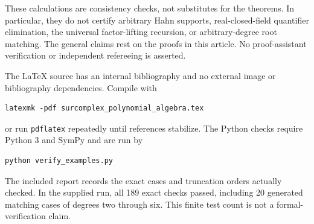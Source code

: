 \documentclass[11pt,letterpaper]{article}
\numberwithin{equation}{section}
\theoremstyle{definition}
\theoremstyle{remark}\newtheorem{remark}[theorem]{Remark}
\begin{document}
These calculations are consistency checks, not substitutes for the
theorems. In particular, they do not certify arbitrary Hahn supports,
real-closed-field quantifier elimination, the universal factor-lifting
recursion, or arbitrary-degree root matching. The general claims rest
on the proofs in this article. No proof-assistant verification or
independent refereeing is asserted.

The LaTeX source has an internal bibliography and no external image or
bibliography dependencies. Compile with
\begin{verbatim}
latexmk -pdf surcomplex_polynomial_algebra.tex
\end{verbatim}
or run \texttt{pdflatex} repeatedly until references stabilize.
The Python checks require Python 3 and SymPy and are run by
\begin{verbatim}
python verify_examples.py
\end{verbatim}
The included report records the exact cases and truncation orders
actually checked. In the supplied run, all 189 exact checks passed,
including 20 generated matching cases of degrees two through six.
This finite test count is not a formal-verification claim.
\end{document}
